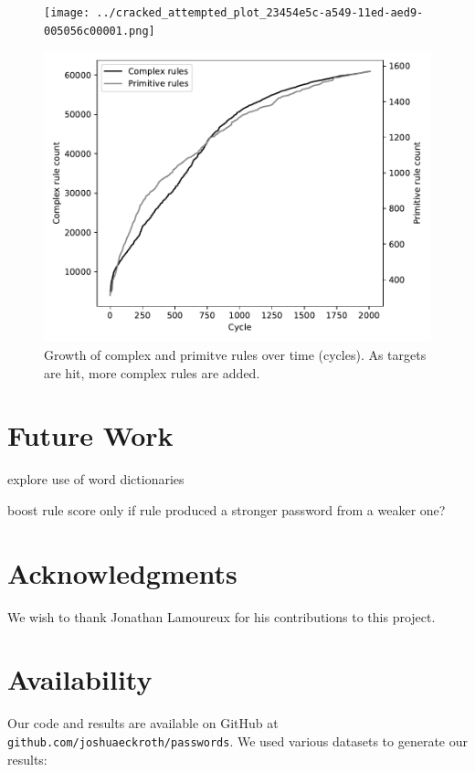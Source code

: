 \documentclass[letterpaper,twocolumn,10pt]{article}
\begin{document}
\begin{figure}
\texttt{[image: ../cracked\_attempted\_plot\_23454e5c-a549-11ed-aed9-005056c00001.png]}
\end{figure}

\begin{figure}
\includegraphics[width=\linewidth]
{analysis/passwords-analysis/stats-rules_composites_size.pdf}
\caption{Growth of complex and primitve rules over time (cycles). As targets
are hit, more complex rules are added. }
\label{fig:rule_count}
\end{figure}

\section{Future Work}

explore use of word dictionaries

boost rule score only if rule produced a stronger password from a weaker one?

\section*{Acknowledgments}

We wish to thank Jonathan Lamoureux for his contributions to this project.

\section*{Availability}

Our code and results are available on GitHub at
\texttt{github.com/joshuaeckroth/passwords}. We used various datasets
to generate our results:
\end{document}
